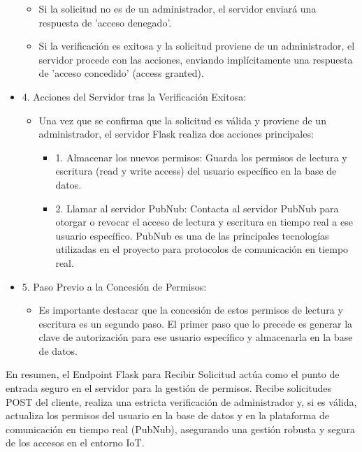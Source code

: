 \documentclass{report}
\begin{document}
\begin{itemize}
\begin{itemize}
            \item Si la solicitud no es de un administrador, el servidor enviará una respuesta de 'acceso denegado'.
            \item Si la verificación es exitosa y la solicitud proviene de un administrador, el servidor procede con las acciones, 
            enviando implícitamente una respuesta de 'acceso concedido' (access granted).
        \end{itemize}
    \item 4. Acciones del Servidor tras la Verificación Exitosa:
        \begin{itemize}
            \item Una vez que se confirma que la solicitud es válida y proviene de un administrador, el servidor Flask realiza dos acciones principales:
                \begin{itemize}
                    \item 1. Almacenar los nuevos permisos: Guarda los permisos de lectura y escritura (read y write access) del usuario 
                    específico en la base de datos.
                    \item 2. Llamar al servidor PubNub: Contacta al servidor PubNub para otorgar o revocar el acceso de lectura y escritura 
                    en tiempo real a ese usuario específico. PubNub es una de las principales tecnologías utilizadas en el proyecto para 
                    protocolos de comunicación en tiempo real.
                \end{itemize}
        \end{itemize}
    \item 5. Paso Previo a la Concesión de Permisos:
        \begin{itemize}
            \item Es importante destacar que la concesión de estos permisos de lectura y escritura es un segundo paso. El primer paso que 
            lo precede es generar la clave de autorización para ese usuario específico y almacenarla en la base de datos.
        \end{itemize}
\end{itemize}
En resumen, el Endpoint Flask para Recibir Solicitud actúa como el punto de entrada seguro en el servidor para la gestión de permisos. 
Recibe solicitudes POST del cliente, realiza una estricta verificación de administrador y, si es válida, actualiza los permisos del usuario 
en la base de datos y en la plataforma de comunicación en tiempo real (PubNub), asegurando una gestión robusta y 
segura de los accesos en el entorno IoT.
\end{document}
